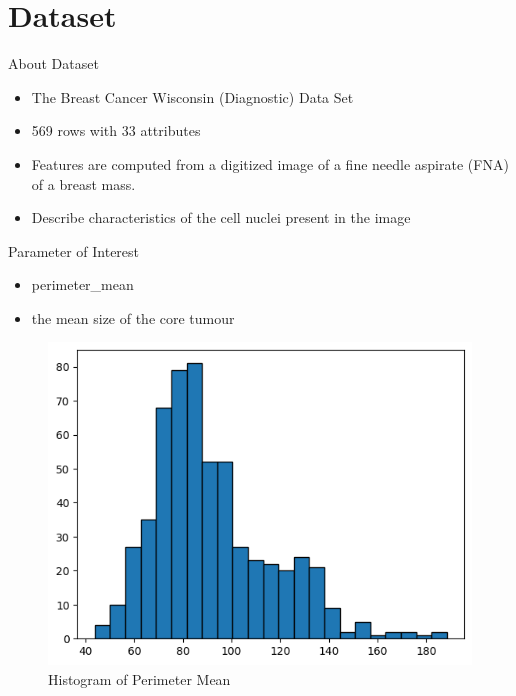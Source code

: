 \section{Dataset}

\begin{frame}{About Dataset}

  \begin{itemize}
    \item The Breast Cancer Wisconsin (Diagnostic) Data Set
    \item 569 rows with 33 attributes
    \item Features are computed from a digitized image of a fine needle aspirate (FNA) of a breast mass.
    \item Describe characteristics of the cell nuclei present in the image
  \end{itemize}
  
\end{frame}

\begin{frame}{Parameter of Interest}

  \begin{itemize}
    \item perimeter\_mean
    \item the mean size of the core tumour
  \end{itemize}

  \vspace{0.25in}

  \begin{figure}
    \centering
    \includegraphics[width=0.5\linewidth]{../Report/images/data-hist.png}
    \caption{Histogram of Perimeter Mean}
  \end{figure}
  
\end{frame}
